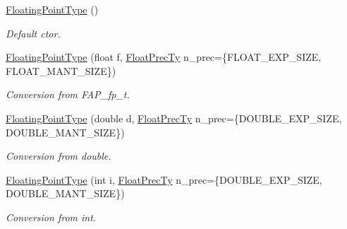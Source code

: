 \begin{DoxyCompactItemize}
\item 
\hypertarget{classfap_1_1FloatingPointType_a7362ec3dd87a16389ead3199e1c69345}{}\label{classfap_1_1FloatingPointType_a7362ec3dd87a16389ead3199e1c69345} 
\hyperlink{classfap_1_1FloatingPointType_a7362ec3dd87a16389ead3199e1c69345}{Floating\+Point\+Type} ()
\begin{DoxyCompactList}\small\item\em Default ctor. \end{DoxyCompactList}\item 
\hyperlink{classfap_1_1FloatingPointType_aa89105fd5d48eb7165b2234f852c7a19}{Floating\+Point\+Type} (float f, \hyperlink{structfap_1_1FloatPrecTy}{Float\+Prec\+Ty} n\+\_\+prec=\{F\+L\+O\+A\+T\+\_\+\+E\+X\+P\+\_\+\+S\+I\+ZE, F\+L\+O\+A\+T\+\_\+\+M\+A\+N\+T\+\_\+\+S\+I\+ZE\})
\begin{DoxyCompactList}\small\item\em Conversion from F\+A\+P\+\_\+fp\+\_\+t. \end{DoxyCompactList}\item 
\hypertarget{classfap_1_1FloatingPointType_aa3b2a25eb533eab4b25f75f506947a50}{}\label{classfap_1_1FloatingPointType_aa3b2a25eb533eab4b25f75f506947a50} 
\hyperlink{classfap_1_1FloatingPointType_aa3b2a25eb533eab4b25f75f506947a50}{Floating\+Point\+Type} (double d, \hyperlink{structfap_1_1FloatPrecTy}{Float\+Prec\+Ty} n\+\_\+prec=\{D\+O\+U\+B\+L\+E\+\_\+\+E\+X\+P\+\_\+\+S\+I\+ZE, D\+O\+U\+B\+L\+E\+\_\+\+M\+A\+N\+T\+\_\+\+S\+I\+ZE\})
\begin{DoxyCompactList}\small\item\em Conversion from double. \end{DoxyCompactList}\item 
\hypertarget{classfap_1_1FloatingPointType_aef499a348920080ca3dbdc728977570a}{}\label{classfap_1_1FloatingPointType_aef499a348920080ca3dbdc728977570a} 
\hyperlink{classfap_1_1FloatingPointType_aef499a348920080ca3dbdc728977570a}{Floating\+Point\+Type} (int i, \hyperlink{structfap_1_1FloatPrecTy}{Float\+Prec\+Ty} n\+\_\+prec=\{D\+O\+U\+B\+L\+E\+\_\+\+E\+X\+P\+\_\+\+S\+I\+ZE, D\+O\+U\+B\+L\+E\+\_\+\+M\+A\+N\+T\+\_\+\+S\+I\+ZE\})
\begin{DoxyCompactList}\small\item\em Conversion from int. \end{DoxyCompactList}\end{DoxyCompactItemize}

